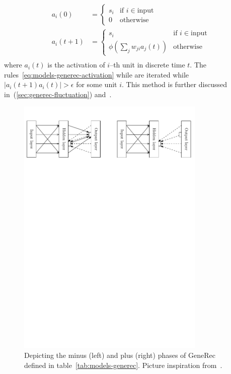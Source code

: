 \begin{align}
  \label{eq:models-generec-activation}
  a_i(0) &= \left\{
	\begin{array}{ll}
		s_i & \mbox{if } i \in \mbox{input} \nonumber \\
		0 & \mbox{otherwise} \nonumber 
	\end{array}
\right. \\
  a_i(t+1) &= \left\{
	\begin{array}{ll}
		s_i & \mbox{if } i \in \mbox{input} \nonumber \\
		\phi(\sum_j w_{ji}a_j(t)) & \mbox{otherwise} \nonumber 
	\end{array}
\right. \\
\end{align} 
where $a_i(t)$ is the activation of $i$--th unit in discrete time $t$. The rules~\ref{eq:models-generec-activation} while are iterated while $|a_i(t+1) a_i(t)| > \epsilon$ for some unit $i$. This method is further discussed in~(\ref{sec:generec-fluctuation}) and~\citep{orru2008sabio}.

\begin{figure}[H]
  \centering
  \includegraphics[width=0.8\textwidth]{img/models-generec-phase.pdf}
  
  \caption{Depicting the minus (left) and plus (right) phases of GeneRec defined in table~\ref{tab:models-generec}. Picture inspiration from~\citet{orru2008sabio}.} 
  \label{fig:models-generec-phase}
\end{figure}

